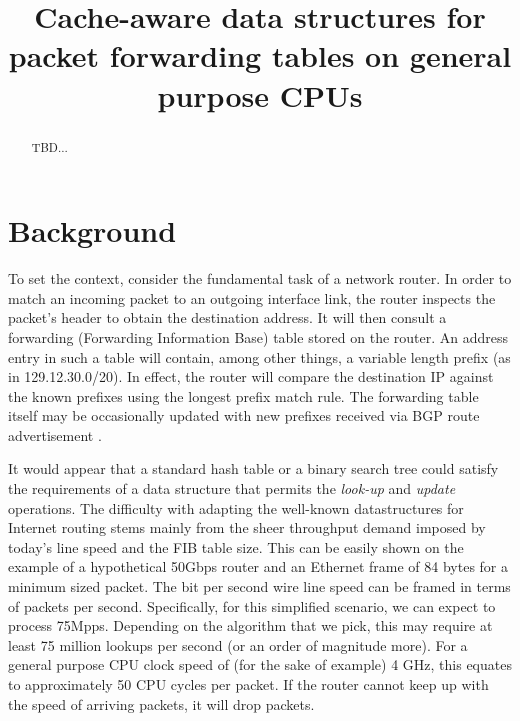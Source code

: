 \documentclass[conference,compsoc]{IEEEtran}
\begin{document}
\title{Cache-aware data structures for packet forwarding tables on general purpose CPUs}
\author{
}

\maketitle

\begin{abstract}
TBD...

\end{abstract}

\section{Background}
To set the context, consider the fundamental task of a network router.
In order to match an incoming packet to an outgoing interface link,
the router inspects the packet's header to obtain the destination address.
It will then consult a forwarding (Forwarding Information Base) table 
stored on the router.
An address entry in such a table will contain, among other things,
a variable length prefix (as in 129.12.30.0/20).
In effect, the router will compare the destination IP
against the known prefixes using the longest prefix match rule.
The forwarding table itself may be occasionally updated with new prefixes
received via BGP route advertisement \cite{Kurose:Networking}.

It would appear that a standard hash table or a binary search tree could
satisfy the requirements of a data structure that permits the 
\textit{look-up} and \textit{update} operations. The difficulty with 
adapting the well-known 
datastructures for Internet routing stems mainly from the sheer throughput
demand imposed by today's line speed and the FIB table size.
This can be easily shown on the example of a hypothetical 50Gbps router and
an Ethernet frame of 84 bytes for a minimum sized packet. The bit per second 
wire line speed can be framed in terms of packets per second. Specifically,
for this simplified scenario, we can expect to process 75Mpps. Depending on
the algorithm that we pick, this may require at least 75 million lookups 
per second (or an order of magnitude more). For a general purpose CPU clock
speed of (for the sake of example) 4 GHz, this equates to approximately 
50 CPU cycles per packet. If the router cannot keep up with the speed of
arriving packets, it will drop packets.
\end{document}

